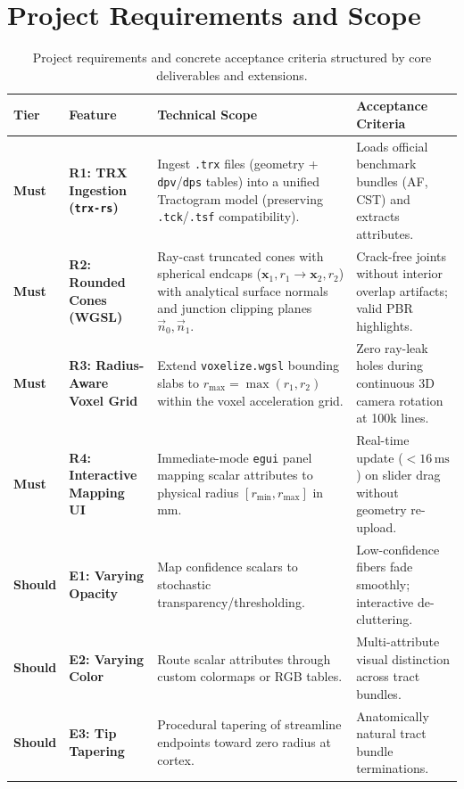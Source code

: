 \documentclass[10pt,a4paper]{article}
\begin{document}
\section{Project Requirements and Scope}
\begin{table}[ht!]
\centering
\small
\begin{tabularx}{\textwidth}{l p{4.6cm} X p{3.6cm}}
\toprule
\textbf{Tier} & \textbf{Feature} & \textbf{Technical Scope} & \textbf{Acceptance Criteria} \\
\midrule
\textbf{Must} & \textbf{R1: TRX Ingestion (\texttt{trx-rs})} & Ingest \texttt{.trx} files (geometry + \texttt{dpv}/\texttt{dps} tables) into a unified Tractogram model (preserving \texttt{.tck}/\texttt{.tsf} compatibility). & Loads official benchmark bundles (AF, CST) and extracts attributes. \\
\textbf{Must} & \textbf{R2: Rounded Cones (WGSL)} & Ray-cast truncated cones with spherical endcaps ($\mathbf{x}_1, r_1 \to \mathbf{x}_2, r_2$) with analytical surface normals and junction clipping planes $\vec{n}_0, \vec{n}_1$. & Crack-free joints without interior overlap artifacts; valid PBR highlights. \\
\textbf{Must} & \textbf{R3: Radius-Aware Voxel Grid} & Extend \texttt{voxelize.wgsl} bounding slabs to $r_{\max} = \max(r_1, r_2)$ within the voxel acceleration grid. & Zero ray-leak holes during continuous 3D camera rotation at 100k lines. \\
\textbf{Must} & \textbf{R4: Interactive Mapping UI} & Immediate-mode \texttt{egui} panel mapping scalar attributes to physical radius $[r_{\min}, r_{\max}]$ in mm. & Real-time update ($< 16\,\text{ms}$) on slider drag without geometry re-upload. \\
\midrule
\textbf{Should} & \textbf{E1: Varying Opacity} & Map confidence scalars to stochastic transparency/thresholding. & Low-confidence fibers fade smoothly; interactive de-cluttering. \\
\textbf{Should} & \textbf{E2: Varying Color} & Route scalar attributes through custom colormaps or RGB tables. & Multi-attribute visual distinction across tract bundles. \\
\textbf{Should} & \textbf{E3: Tip Tapering} & Procedural tapering of streamline endpoints toward zero radius at cortex. & Anatomically natural tract bundle terminations. \\
\bottomrule
\end{tabularx}
\caption{Project requirements and concrete acceptance criteria structured by core deliverables and extensions.}
\label{tab:requirements}
\end{table}
\end{document}
